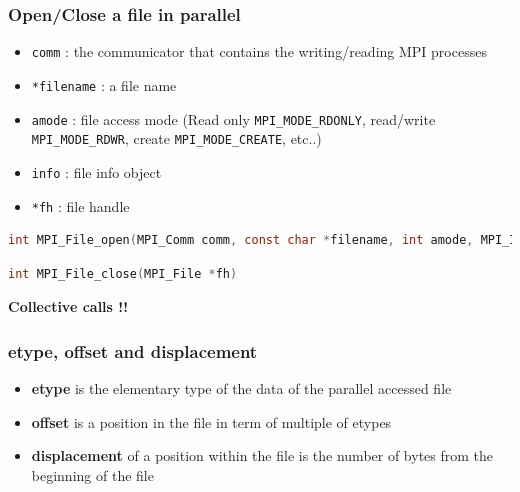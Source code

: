 \begin{frame}[containsverbatim]
\frametitle{Open/Close a file in parallel}
\begin{itemize}
	\item {\verb+comm+ : the communicator that contains the writing/reading MPI processes}
	\item {\verb+*filename+ : a file name}
	\item {\verb+amode+ : file access mode (Read only \verb+MPI_MODE_RDONLY+, read/write \verb+MPI_MODE_RDWR+, create \verb+MPI_MODE_CREATE+, etc..)}
	\item {\verb+info+ : file info object}
	\item {\verb+*fh+ : file handle}
\end{itemize}

\begin{lstlisting}[language=C,frame=lines]
int MPI_File_open(MPI_Comm comm, const char *filename, int amode, MPI_Info info, MPI_File *fh)
\end{lstlisting}

\begin{lstlisting}[language=C,frame=lines]
int MPI_File_close(MPI_File *fh)
\end{lstlisting}
\textbf{Collective calls !!}
\end{frame}


\begin{frame}[containsverbatim]
\frametitle{etype, offset and displacement}
\begin{itemize}
	\item {\textbf{etype} is the elementary type of the data of the parallel accessed file}
	\item {\textbf{offset} is a position in the file in term of multiple of etypes}
	\item {\textbf{displacement} of a position within the file is the number of bytes from the beginning of the file}
\end{itemize}
\begin{center}

\end{center}
\end{frame}


